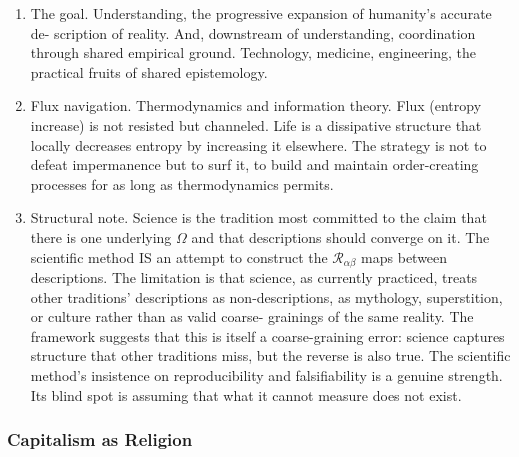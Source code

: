 \documentclass[
]{article}
\providecommand{\tightlist}{%
  \setlength{\itemsep}{0pt}\setlength{\parskip}{0pt}}
\begin{document}
\begin{enumerate}
\def\labelenumi{\arabic{enumi}.}
\setcounter{enumi}{79}
\tightlist
\item
  The goal. Understanding, the progressive expansion of humanity's
  accurate de- scription of reality. And, downstream of understanding,
  coordination through shared empirical ground. Technology, medicine,
  engineering, the practical fruits of shared epistemology.
\item
  Flux navigation. Thermodynamics and information theory. Flux (entropy
  increase) is not resisted but channeled. Life is a dissipative
  structure that locally decreases entropy by increasing it elsewhere.
  The strategy is not to defeat impermanence but to surf it, to build
  and maintain order-creating processes for as long as thermodynamics
  permits.
\item
  Structural note. Science is the tradition most committed to the claim
  that there is one underlying \(\Omega\) and that descriptions should
  converge on it. The scientific method IS an attempt to construct the
  \(\mathcal{R}_{\alpha\beta}\) maps between descriptions. The
  limitation is that science, as currently practiced, treats other
  traditions' descriptions as non-descriptions, as mythology,
  superstition, or culture rather than as valid coarse- grainings of the
  same reality. The framework suggests that this is itself a
  coarse-graining error: science captures structure that other
  traditions miss, but the reverse is also true. The scientific method's
  insistence on reproducibility and falsifiability is a genuine
  strength. Its blind spot is assuming that what it cannot measure does
  not exist.
\end{enumerate}

\subsubsection{Capitalism as Religion}\label{capitalism-as-religion}
\end{document}
